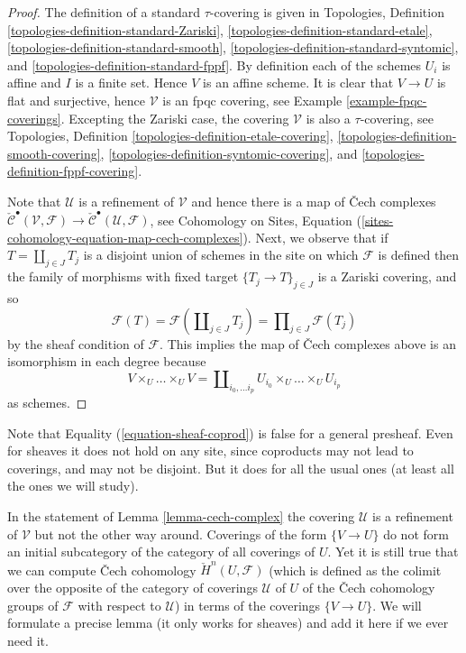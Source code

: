 \begin{proof}
The definition of a standard $\tau$-covering is given in
Topologies, Definition
\ref{topologies-definition-standard-Zariski},
\ref{topologies-definition-standard-etale},
\ref{topologies-definition-standard-smooth},
\ref{topologies-definition-standard-syntomic}, and
\ref{topologies-definition-standard-fppf}.
By definition each of the schemes
$U_i$ is affine and $I$ is a finite set. Hence $V$ is an affine scheme.
It is clear that $V \to U$ is flat and surjective, hence
$\mathcal{V}$ is an fpqc covering, see
Example \ref{example-fpqc-coverings}.
Excepting the Zariski case, the covering $\mathcal{V}$
is also a $\tau$-covering, see
Topologies, Definition
\ref{topologies-definition-etale-covering},
\ref{topologies-definition-smooth-covering},
\ref{topologies-definition-syntomic-covering}, and
\ref{topologies-definition-fppf-covering}.

\medskip\noindent
Note that $\mathcal{U}$ is a refinement of $\mathcal{V}$
and hence there is a map of {\v C}ech complexes
$\check{\mathcal{C}}^\bullet (\mathcal{V}, \mathcal{F}) \to
\check{\mathcal{C}}^\bullet (\mathcal{U}, \mathcal{F})$, see
Cohomology on Sites,
Equation (\ref{sites-cohomology-equation-map-cech-complexes}).
Next, we observe that if $T = \coprod_{j \in J} T_j$ is a
disjoint union of schemes in the site on which $\mathcal{F}$ is defined
then the family of morphisms with fixed target
$\{T_j \to T\}_{j \in J}$ is a Zariski covering, and so
\begin{equation}
\label{equation-sheaf-coprod}
\mathcal{F}(T) =
\mathcal{F}(\coprod\nolimits_{j \in J} T_j) =
\prod\nolimits_{j \in J} \mathcal{F}(T_j)
\end{equation}
by the sheaf condition of $\mathcal{F}$.
This implies the map of {\v C}ech complexes above is an isomorphism
in each degree because
$$
V \times_U \ldots \times_U V
=
\coprod\nolimits_{i_0, \ldots i_p} U_{i_0} \times_U \ldots \times_U U_{i_p}
$$
as schemes.
\end{proof}

\noindent
Note that Equality (\ref{equation-sheaf-coprod})
is false for a general presheaf. Even for sheaves it does not hold on any
site, since coproducts may not lead to coverings, and may not be disjoint.
But it does for all the usual ones (at least all the ones we will study).

\begin{remark}
\label{remark-refinement}
In the statement of Lemma \ref{lemma-cech-complex} the covering $\mathcal{U}$
is a refinement of $\mathcal{V}$ but not the other way around. Coverings
of the form $\{V \to U\}$ do not form an initial subcategory of the
category of all coverings of $U$. Yet it is still true that
we can compute {\v C}ech cohomology $\check H^n(U, \mathcal{F})$ (which
is defined as the colimit over the opposite of the category of
coverings $\mathcal{U}$ of $U$ of the {\v C}ech cohomology groups of
$\mathcal{F}$ with respect to $\mathcal{U}$) in terms of the coverings
$\{V \to U\}$. We will formulate a precise lemma (it only works for sheaves)
and add it here if we ever need it.
\end{remark}

